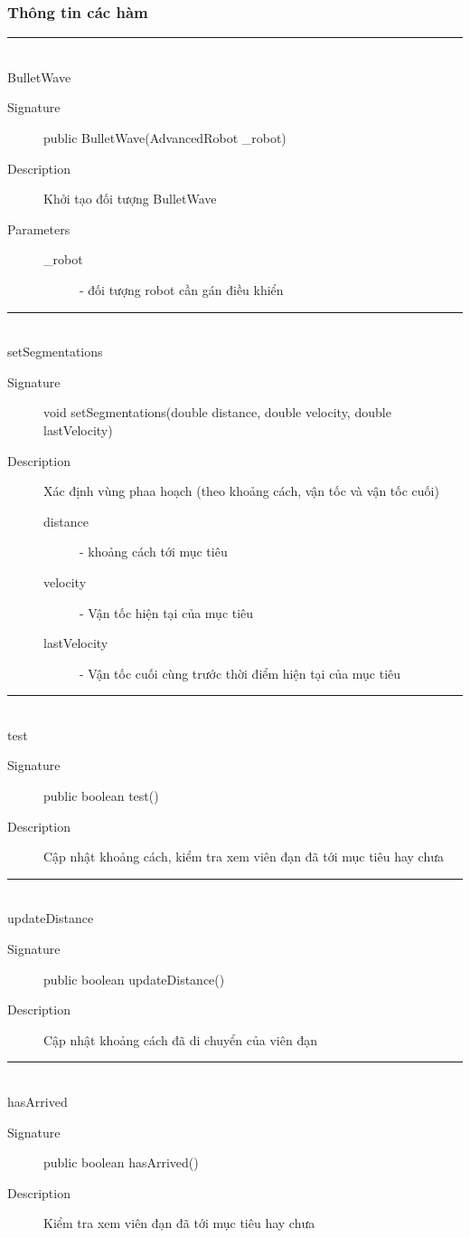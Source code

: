 \documentclass[14pt]{article}
\newcommand{\sep}{\rule{\textwidth}{0.007pt}\\}
\begin{document}
\subsubsection{Thông tin các hàm}
\sep
BulletWave
	\begin{description}
		\item[Signature] public BulletWave(AdvancedRobot _robot)
		\item[Description] Khởi tạo đối tượng BulletWave
		\item[Parameters]
		\begin{description}
				\item[_robot] - đối tượng robot cần gán điều khiển
			\end{description}
		\end{description}
\sep
setSegmentations
	\begin{description}
		\item[Signature]void setSegmentations(double distance, double velocity, double lastVelocity)
		\item[Description]Xác định vùng phaa hoạch (theo khoảng cách, vận tốc và vận tốc cuối)
		\begin{description}
				\item[distance] - khoảng cách tới mục tiêu
				\item[velocity] - Vận tốc hiện tại của mục tiêu
				\item[lastVelocity] - Vận tốc cuối cùng trước thời điểm hiện tại của mục tiêu
			\end{description}
	\end{description}		
\sep
test
	\begin{description}
		\item[Signature]public boolean test()
		\item[Description] Cập nhật khoảng cách, kiểm tra xem viên đạn đã tới mục tiêu hay chưa
	\end{description}		
\sep
updateDistance
	\begin{description}
		\item[Signature]public boolean updateDistance()
		\item[Description] Cập nhật khoảng cách đã di chuyển của viên đạn
	\end{description}		
\sep
hasArrived
	\begin{description}
		\item[Signature]public boolean hasArrived()
		\item[Description] Kiểm tra xem viên đạn đã tới mục tiêu hay chưa
	\end{description}		
\end{document}
